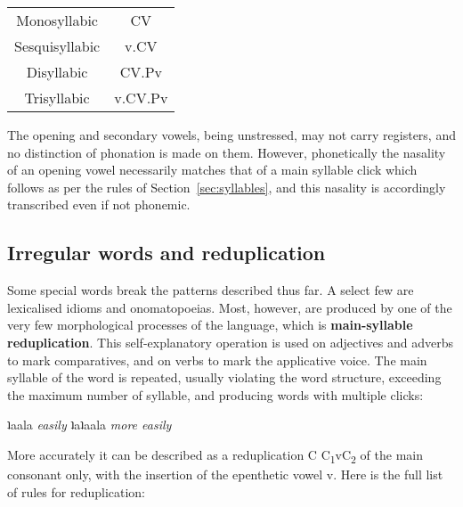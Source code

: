 \documentclass[11pt,a5paper]{book}
\newcommand{\qcn}[1]{\textcolor{AccentText}{\large#1}}
\newcommand{\transl}[2]{\qcn{#1} \emph{#2}}
\begin{document}
\begin{center}
\begin{tabular}{cc}
	Monosyllabic &  CV \\
	Sesquisyllabic &   v.\stress{}CV \\
	Disyllabic & \stress{}CV.Pv\\
	Trisyllabic & v.\stress{}CV.Pv
\end{tabular}
\end{center}

The opening and secondary vowels, being unstressed, may not carry registers, and no distinction of phonation is made on them. However, phonetically the nasality of an opening vowel necessarily matches that of a main syllable click which follows as per the rules of Section~\ref{sec:syllables}, and this nasality is accordingly transcribed even if not phonemic.

\subsection{Irregular words and reduplication}\label{sec:redup}

Some special words break the patterns described thus far. A select few are lexicalised idioms and onomatopoeias. Most, however, are produced by one of the very few morphological processes of the language, which is \textbf{main-syllable reduplication}. This self-explanatory operation is used on adjectives and adverbs to mark comparatives, and on verbs to mark the applicative voice. The main syllable of the word is repeated, usually violating the word structure, exceeding the maximum number of syllable, and producing words with multiple clicks:

\begin{center}
\transl{ʇaala}{easily} \textrightarrow \transl{ʇaʇaala}{more easily}
\end{center}

More accurately it can be described as a reduplication C \textrightarrow C\textsubscript{1}vC\textsubscript{2} of the main consonant only, with the insertion of the epenthetic vowel v. Here is the full list of rules for reduplication:
\end{document}
